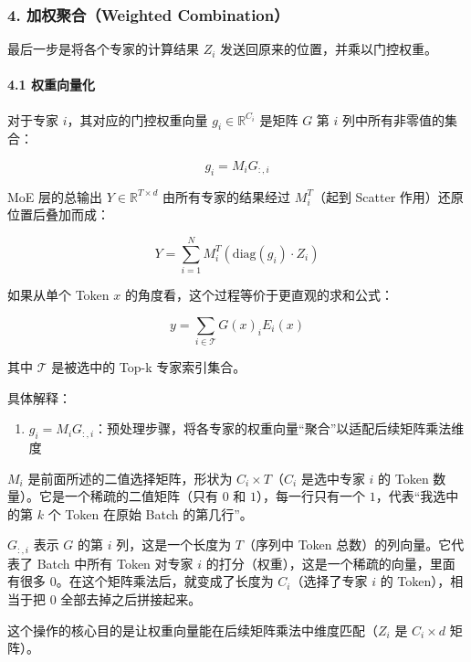 \hypertarget{ux52a0ux6743ux805aux5408weighted-combination}{%
\subsubsection{4. 加权聚合（Weighted Combination）}\label{ux52a0ux6743ux805aux5408weighted-combination}}

最后一步是将各个专家的计算结果 \(Z_i\) 发送回原来的位置，并乘以门控权重。

\hypertarget{ux6743ux91cdux5411ux91cfux5316}{%
\paragraph{4.1 权重向量化}\label{ux6743ux91cdux5411ux91cfux5316}}

对于专家 \(i\)，其对应的门控权重向量 \(g_i \in \mathbb{R}^{C_i}\) 是矩阵 \(G\) 第 \(i\) 列中所有非零值的集合：

\[
g_i = M_iG_{:,i}
\]

MoE 层的总输出 \(Y \in \mathbb{R}^{T \times d}\) 由所有专家的结果经过 \(M_i^T\)（起到 Scatter 作用）还原位置后叠加而成：

\[
Y = \sum_{i=1}^{N} M_i^T(\mathrm{diag}(g_i) \cdot Z_i)
\]

如果从单个 Token \(x\) 的角度看，这个过程等价于更直观的求和公式：

\[
y = \sum_{i \in \mathcal{T}} G(x)_iE_i(x)
\]

其中 \(\mathcal{T}\) 是被选中的 Top-k 专家索引集合。

具体解释：

\begin{enumerate}
\def\labelenumi{\arabic{enumi}.}
\tightlist
\item
  \(g_i=M_iG_{:,i}\)：预处理步骤，将各专家的权重向量``聚合''以适配后续矩阵乘法维度
\end{enumerate}

\(M_i\) 是前面所述的二值选择矩阵，形状为 \(C_i\times T\)（\(C_i\) 是选中专家 \(i\) 的 Token 数量）。它是一个稀疏的二值矩阵（只有 \(0\) 和 \(1\)），每一行只有一个 \(1\)，代表``我选中的第 \(k\) 个 Token 在原始 Batch 的第几行''。

\(G_{:,i}\) 表示 \(G\) 的第 \(i\) 列，这是一个长度为 \(T\)（序列中 Token 总数）的列向量。它代表了 Batch 中所有 Token 对专家 \(i\) 的打分（权重），这是一个稀疏的向量，里面有很多 \(0\)。在这个矩阵乘法后，就变成了长度为 \(C_i\)（选择了专家 \(i\) 的 Token），相当于把 \(0\) 全部去掉之后拼接起来。

这个操作的核心目的是让权重向量能在后续矩阵乘法中维度匹配（\(Z_i\) 是 \(C_i\times d\) 矩阵）。

